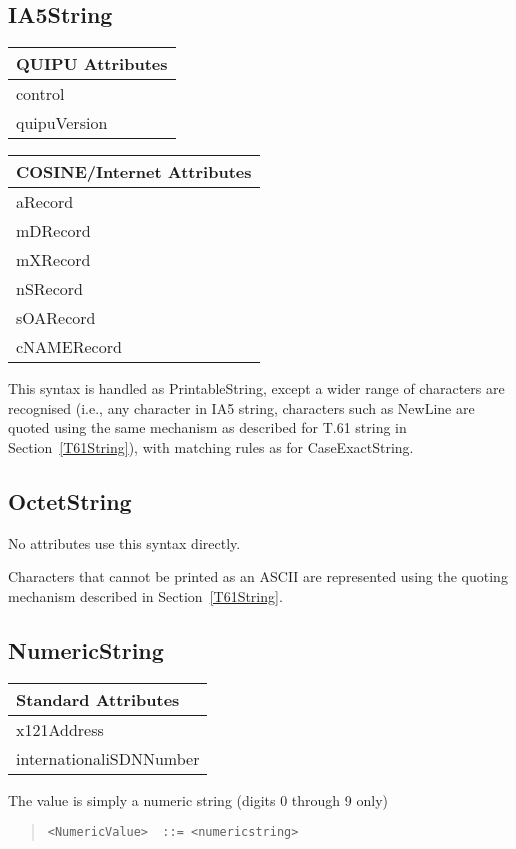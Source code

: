 \subsection{IA5String}
\begin{center}\small
\begin{tabular}{|l|}\hline
QUIPU Attributes \\ \hline
	control\\
	quipuVersion\\
\hline
\end{tabular}
\begin{tabular}{|l|}\hline
COSINE/Internet Attributes \\ \hline
	aRecord\\
	mDRecord\\
	mXRecord\\
	nSRecord\\
	sOARecord\\
	cNAMERecord\\
\hline
\end{tabular}
\end{center}

This syntax is handled as PrintableString, except a wider range of
characters are recognised (i.e., any character in IA5 string, characters such
as NewLine are quoted using the same mechanism as described for T.61 string
in Section~\ref{T61String}), with matching rules as for CaseExactString.



\subsection{OctetString}

No attributes use this syntax directly.

Characters that cannot be printed as an ASCII are represented using the
quoting mechanism described in Section~\ref{T61String}.

\subsection{NumericString}
\begin{center}\small
\begin{tabular}{|l|}\hline
Standard Attributes \\ \hline
	x121Address\\
	internationaliSDNNumber\\
\hline
\end{tabular}
\end{center}
The value is simply a numeric string (digits 0 through 9 only)
\begin{quote}\begin{verbatim}
<NumericValue>	::= <numericstring>
\end{verbatim}\end{quote}

